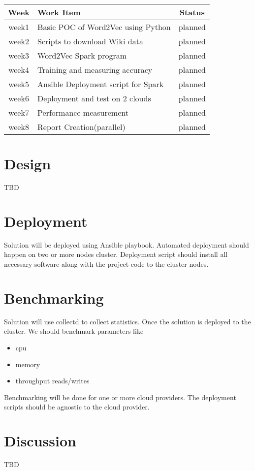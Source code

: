 \documentclass[9pt,twocolumn,twoside]{styles/osajnl}
\begin{document}
\begin{center}
\begin{tabular}{ |c|l|c| } 
 \hline
Week & Work Item & Status \\
\hline
week1 & Basic POC of Word2Vec using Python  & planned \\ 
week2 & Scripts to download Wiki data & planned \\ 
week3 & Word2Vec Spark program & planned \\ 
week4 & Training and measuring accuracy & planned \\ 
week5 &  Ansible Deployment script for Spark & planned \\ 
week6 & Deployment and test on 2 clouds & planned \\ 
week7 & Performance measurement  & planned \\ 
week8 & Report Creation(parallel) & planned \\ 
 \hline
\end{tabular}
\end{center}

\section{Design}
TBD

\section{Deployment}
Solution will be deployed using Ansible \cite{www-ansible} playbook. Automated deployment should happen on two or more nodes cluster. Deployment script should install all necessary software along with the project code to the cluster nodes.

\section{Benchmarking}
Solution will use collectd \cite{www-collectd} to collect statistics. Once the solution is deployed to the cluster. We should benchmark parameters like
\begin{itemize}[noitemsep]
\item cpu
\item memory
\item throughput reads/writes
\end{itemize}
Benchmarking will be done for one or more cloud providers. The deployment scripts should be agnostic to the cloud provider. 

\section{Discussion}
TBD
\end{document}
